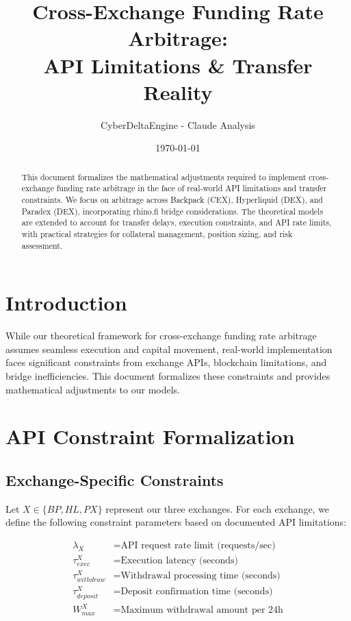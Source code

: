 \documentclass{article}
\title{Cross-Exchange Funding Rate Arbitrage: \\ API Limitations \& Transfer Reality}
\author{CyberDeltaEngine - Claude Analysis}
\date{\today}
\begin{document}
\maketitle

\begin{abstract}
This document formalizes the mathematical adjustments required to implement cross-exchange funding rate arbitrage in the face of real-world API limitations and transfer constraints. We focus on arbitrage across Backpack (CEX), Hyperliquid (DEX), and Paradex (DEX), incorporating rhino.fi bridge considerations. The theoretical models are extended to account for transfer delays, execution constraints, and API rate limits, with practical strategies for collateral management, position sizing, and risk assessment.
\end{abstract}

\section{Introduction}

While our theoretical framework for cross-exchange funding rate arbitrage assumes seamless execution and capital movement, real-world implementation faces significant constraints from exchange APIs, blockchain limitations, and bridge inefficiencies. This document formalizes these constraints and provides mathematical adjustments to our models.

\section{API Constraint Formalization}

\subsection{Exchange-Specific Constraints}

Let $X \in \{BP, HL, PX\}$ represent our three exchanges. For each exchange, we define the following constraint parameters based on documented API limitations:

\begin{align}
\lambda_X &= \text{API request rate limit (requests/sec)} \\
\tau_{exec}^X &= \text{Execution latency (seconds)} \\
\tau_{withdraw}^X &= \text{Withdrawal processing time (seconds)} \\
\tau_{deposit}^X &= \text{Deposit confirmation time (seconds)} \\
W_{max}^X &= \text{Maximum withdrawal amount per 24h}
\end{align}
\end{document}

